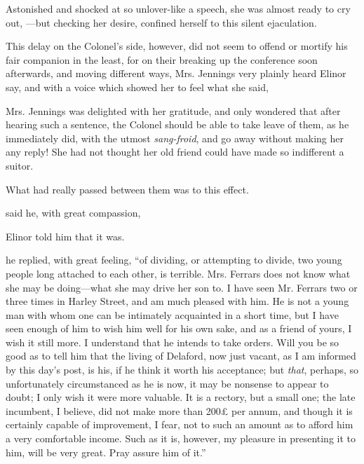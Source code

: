 
Astonished and shocked at so unlover-like a speech, she was almost ready to cry out, ---but checking her desire, confined herself to this silent ejaculation.


This delay on the Colonel's side, however, did not seem to offend or mortify his fair companion in the least, for on their breaking up the conference soon afterwards, and moving different ways, Mrs. Jennings very plainly heard Elinor say, and with a voice which showed her to feel what she said,


Mrs. Jennings was delighted with her gratitude, and only wondered that after hearing such a sentence, the Colonel should be able to take leave of them, as he immediately did, with the utmost {\em sang-froid}, and go away without making her any reply! She had not thought her old friend could have made so indifferent a suitor.

What had really passed between them was to this effect.

 said he, with great compassion, 

Elinor told him that it was.

 he replied, with great feeling, “of dividing, or attempting to divide, two young people long attached to each other, is terrible. Mrs. Ferrars does not know what she may be doing---what she may drive her son to. I have seen Mr. Ferrars two or three times in Harley Street, and am much pleased with him. He is not a young man with whom one can be intimately acquainted in a short time, but I have seen enough of him to wish him well for his own sake, and as a friend of yours, I wish it still more. I understand that he intends to take orders. Will you be so good as to tell him that the living of Delaford, now just vacant, as I am informed by this day's post, is his, if he think it worth his acceptance; but {\em that}, perhaps, so unfortunately circumstanced as he is now, it may be nonsense to appear to doubt; I only wish it were more valuable. It is a rectory, but a small one; the late incumbent, I believe, did not make more than 200£ per annum, and though it is certainly capable of improvement, I fear, not to such an amount as to afford him a very comfortable income. Such as it is, however, my pleasure in presenting it to him, will be very great. Pray assure him of it.”

